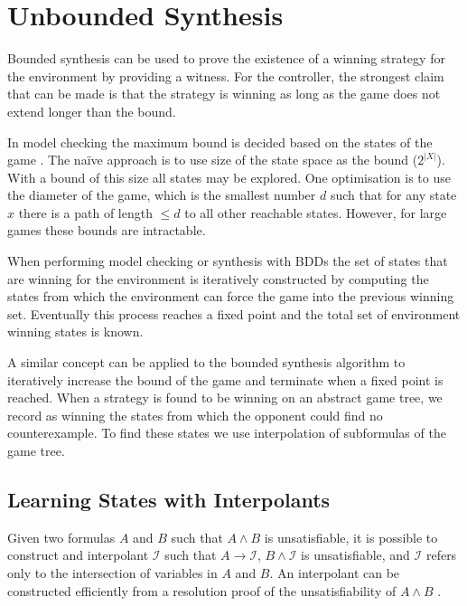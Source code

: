 \documentclass{llncs}
\begin{document}
\section{Unbounded Synthesis}

\label{sect:unbounded}

Bounded synthesis can be used to prove the existence of a winning strategy for
the environment by providing a witness. For the controller, the strongest claim
that can be made is that the strategy is winning as long as the game does not
extend longer than the bound.

In model checking the maximum bound is decided based on the states of the game
\cite{biere1999}. The na\"ive approach is to use size of the state space as the
bound ($2^{|X|}$). With a bound of this size all states may be explored. One
optimisation is to use the diameter of the game, which is the smallest number
$d$ such that for any state $x$ there is a path of length $\leq d$ to all other
reachable states. However, for large games these bounds are intractable.

When performing model checking or synthesis with BDDs \cite{burch1990} the set
of states that are winning for the environment is iteratively constructed by
computing the states from which the environment can force the game into the
previous winning set. Eventually this process reaches a fixed point and the
total set of environment winning states is known.

A similar concept can be applied to the bounded synthesis algorithm to
iteratively increase the bound of the game and terminate when a fixed point is
reached. When a strategy is found to be winning on an abstract game tree, we
record as winning the states from which the opponent could find no
counterexample. To find these states we use interpolation of subformulas of the
game tree.

\subsection{Learning States with Interpolants}

Given two formulas $A$ and $B$ such that $A \land B$ is unsatisfiable, it is
possible to construct and interpolant $\mathcal{I}$ such that $A \to
\mathcal{I}$, $B \land \mathcal{I}$ is unsatisfiable, and $\mathcal{I}$ refers
only to the intersection of variables in $A$ and $B$. An interpolant can be
constructed efficiently from a resolution proof of the unsatisfiability of $A
\land B$ \cite{pudlak1997}.
\end{document}
